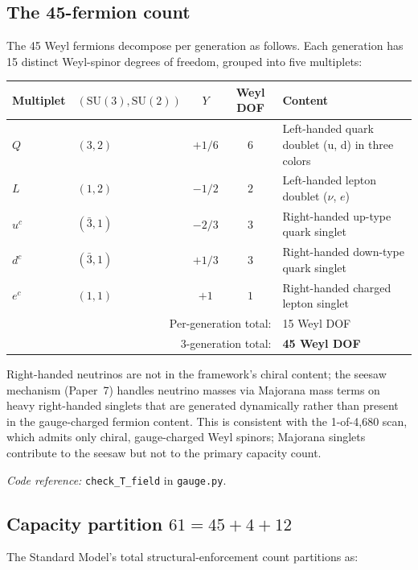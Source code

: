 \documentclass[11pt]{article}
\newcommand{\coderef}[2]{\smallskip\noindent\textit{Code reference:} \texttt{#1} in \texttt{#2}.}
\newcommand{\SU}{\mathrm{SU}}
\theoremstyle{definition}
\begin{document}
\subsection{The 45-fermion count}\label{sec:45_fermion}

The 45 Weyl fermions decompose per generation as follows. Each generation has 15 distinct Weyl-spinor degrees of freedom, grouped into five multiplets:

\begin{center}\small
\begin{tabular}{@{}l l c c l@{}}
\toprule
\textbf{Multiplet} & \textbf{$(\SU(3), \SU(2))$} & \textbf{$Y$} & \textbf{Weyl DOF} & \textbf{Content} \\
\midrule
$Q$ & $(3, 2)$    & $+1/6$ & $6$ & Left-handed quark doublet (u, d) in three colors \\
$L$ & $(1, 2)$    & $-1/2$ & $2$ & Left-handed lepton doublet ($\nu$, $e$) \\
$u^c$ & $(\bar 3, 1)$ & $-2/3$ & $3$ & Right-handed up-type quark singlet \\
$d^c$ & $(\bar 3, 1)$ & $+1/3$ & $3$ & Right-handed down-type quark singlet \\
$e^c$ & $(1, 1)$    & $+1$ & $1$ & Right-handed charged lepton singlet \\
\midrule
\multicolumn{4}{r}{Per-generation total:} & 15 Weyl DOF \\
\multicolumn{4}{r}{3-generation total:} & \textbf{45 Weyl DOF} \\
\bottomrule
\end{tabular}
\end{center}

Right-handed neutrinos are not in the framework's chiral content; the seesaw mechanism (Paper~7) handles neutrino masses via Majorana mass terms on heavy right-handed singlets that are generated dynamically rather than present in the gauge-charged fermion content. This is consistent with the 1-of-4{,}680 scan, which admits only chiral, gauge-charged Weyl spinors; Majorana singlets contribute to the seesaw but not to the primary capacity count.

\coderef{check\_T\_field}{gauge.py}

\subsection{Capacity partition \texorpdfstring{$61 = 45 + 4 + 12$}{61 = 45 + 4 + 12}}\label{sec:61_partition}

The Standard Model's total structural-enforcement count partitions as:
\end{document}
